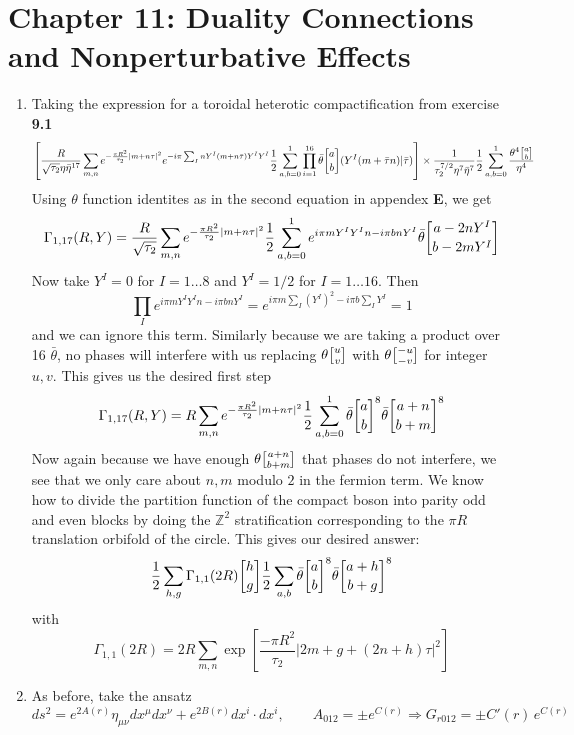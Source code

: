 \documentclass[11pt, class=article, crop=false]{standalone}
\begin{document}
\section*{Chapter 11: Duality Connections and Nonperturbative Effects} %
\label{sec:chapter_11_duality_connections_and_nonperturbative_effects}
\begin{enumerate}
	\item Taking the expression for a toroidal heterotic compactification from exercise \textbf{9.1} 
	\[
		\left[\frac{R}{\sqrt{\tau_2} \eta \bar \eta^{17}} \sum_{m,n} e^{-\frac{\pi R^2}{\tau_2} |m + n \tau|^2} e^{-i \pi \sum_I n Y^I (m + n \bar \tau) Y^I Y^I}\frac12 \sum_{a,b=0}^1  \prod_{i=1}^{16} \bar \theta \twist ab (Y^I (m + \bar \tau n) | \bar \tau) \right] \times \frac{1}{\tau_2^{7/2} \eta^7 \bar \eta^7} \frac12 \sum_{a,b = 0}^1 \frac{\theta^4 \twist a b}{\eta^4}
	\]
	Using $\theta$ function identites as in the second equation in appendex \textbf{E}, we get
	\[
		\Gamma_{1,17}(R, Y) = \frac{R}{\sqrt{\tau_2}} \sum_{m,n} e^{-\frac{\pi R^2}{\tau_2} |m + n \tau|^2} \frac12 \sum_{a,b=0}^1 e^{i \pi m Y^I Y^I n - i \pi b n Y^I} \bar \theta \twist{a - 2n Y^I}{b - 2m Y^I}
	\]
	Now take $Y^I = 0$ for $I = 1 \dots 8$ and $Y^I = 1/2$ for $I = 1 \dots 16$. Then
	\[
		\prod_I e^{i \pi m Y^I Y^I n - i \pi b n Y^I}  = e^{i \pi m \sum_I (Y^I)^2 - i \pi b \sum_I Y^I} = 1
	\]
	and we can ignore this term. Similarly because we are taking a product over 16 $\bar \theta$, no phases will interfere with us replacing $\theta\twist uv$ with $\theta \twist{-u}{-v}$ for integer $u, v$. This gives us the desired first step
	\[
		\Gamma_{1,17}(R, Y) = R \sum_{m,n} e^{-\frac{\pi R^2}{\tau_2} |m + n \tau|^2} \frac12 \sum_{a,b=0}^1 \bar \theta \twist ab^8 \bar \theta \twist{a+n}{b+m}^8
	\]
	Now again because we have enough $\theta \twist{a+n}{b+m}$ that phases do not interfere, we see that we only care about $n,m$ modulo $2$ in the fermion term. We know how to divide the partition function of the compact boson into parity odd and even blocks by doing the $\mathbb Z^2$ stratification corresponding to the $\pi R$ translation orbifold of the circle. This gives our desired answer:
	\[
		\frac12 \sum_{h,g} \Gamma_{1,1}(2R) \twist hg \frac12 \sum_{a,b} \bar \theta \twist ab^8 \bar \theta \twist{a+h}{b+g}^8
	\]
	with 
	\[
		\Gamma_{1,1} (2R) = 2R \sum_{m,n} \exp\left[\frac{-\pi R^2}{\tau_2} |2m + g + (2n + h)\tau|^2 \right]
	\]
	
	\item As before, take the ansatz
	\[
		ds^2 = e^{2A(r)} \eta_{\mu \nu} dx^\mu dx^\nu + e^{2B(r)} dx^i \cdot dx^i, \qquad A_{012} = \pm e^{C(r)} \Rightarrow G_{r 012} = \pm C'(r)\, e^{C(r)}
	\]
	

\end{enumerate}
\end{document}
